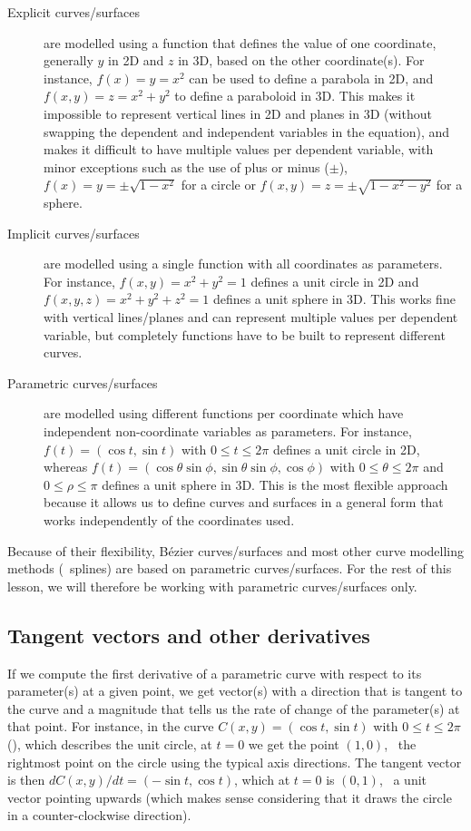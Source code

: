\begin{description}
\item[Explicit curves/surfaces] are modelled using a function that defines the value of one coordinate, generally \(y\) in 2D and \(z\) in 3D, based on the other coordinate(s).
For instance, \(f(x)=y=x^2\) can be used to define a parabola in 2D, and \(f(x,y)=z=x^2+y^2\) to define a paraboloid in 3D.
This makes it impossible to represent vertical lines in 2D and planes in 3D (without swapping the dependent and independent variables in the equation), and makes it difficult to have multiple values per dependent variable, with minor exceptions such as the use of plus or minus (\(\pm\)), \eg\ \(f(x)=y = \pm\sqrt{1-x^2}\) for a circle or \(f(x,y)=z = \pm\sqrt{1-x^2-y^2}\) for a sphere.

\item[Implicit curves/surfaces] are modelled using a single function with all coordinates as parameters.
For instance, \(f(x,y) = x^2+y^2=1\) defines a unit circle in 2D and \(f(x,y,z)=x^2+y^2+z^2=1\) defines a unit sphere in 3D.
This works fine with vertical lines/planes and can represent multiple values per dependent variable, but completely functions have to be built to represent different curves.

\item[Parametric curves/surfaces] are modelled using different functions per coordinate which have independent non-coordinate variables as parameters.
For instance, \(f(t) = (\cos t, \sin t)\) with \(0 \leq t \leq 2\pi \) defines a unit circle in 2D, whereas \(f(t) = (\cos \theta \sin \phi , \sin \theta \sin \phi, \cos \phi)\) with \(0 \leq \theta \leq 2\pi \) and \(0 \leq \rho \leq \pi \) defines a unit sphere in 3D.
This is the most flexible approach because it allows us to define curves and surfaces in a general form that works independently of the coordinates used. 
\end{description}

Because of their flexibility, B\'ezier curves/surfaces and most other curve modelling methods (\eg\ splines) are based on parametric curves/surfaces.
For the rest of this lesson, we will therefore be working with parametric curves/surfaces only.

\subsection{Tangent vectors and other derivatives}

If we compute the first derivative of a parametric curve with respect to its parameter(s) at a given point, we get vector(s) with a direction that is tangent to the curve and a magnitude that tells us the rate of change of the parameter(s) at that point.
For instance, in the curve \(C(x,y) = (\cos t, \sin t)\) with \(0 \leq t \leq 2\pi \) (), which describes the unit circle, at \(t=0\) we get the point \((1, 0)\), \ie\ the rightmost point on the circle using the typical axis directions.
The tangent vector is then \(dC(x,y)/dt = (-\sin t, \cos t)\), which at \(t=0\) is \((0, 1)\), \ie\ a unit vector pointing upwards (which makes sense considering that it draws the circle in a counter-clockwise direction).

